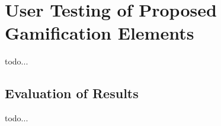 \chapter{User Testing of Proposed Gamification Elements}

todo...

\section{Evaluation of Results}

todo...